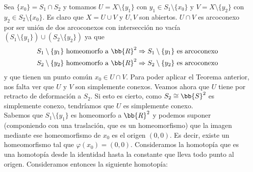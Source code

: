 \begin{ejemplo}
\begin{enumerate}
\begin{figure}[ht]
        \end{figure}
        
        Sea $\{x_0\} = S_1\cap S_2$ y tomamos $U=X\setminus\{y_1\}$ con $y_1\in S_1\setminus\{x_0\}$ y $V=X\setminus\{y_2\}$ con $y_2\in S_2\setminus\{x_0\}$. Es claro que $X=U \cup V$ y $U,V$ son abiertos. $U\cap V$ es arcoconexo por ser unión de dos arcoconexos con intersección no vacía $(S_1\setminus\{y_1\})\cup (S_2\setminus\{y_2\})$ ya que 
        \begin{gather*}
            S_1\setminus\{y_1\} \text{ homeomorfo a } \bb{R}^2 \Rightarrow S_1\setminus\{y_1\} \text{ es arcoconexo}\\
            S_2\setminus\{y_2\} \text{ homeomorfo a } \bb{R}^2 \Rightarrow S_2\setminus\{y_2\} \text{ es arcoconexo}
        \end{gather*}
        y que tienen un punto común $x_0\in U\cap V$. Para poder aplicar el Teorema anterior, nos falta ver que $U$ y $V$ son simplemente conexos. Veamos ahora que $U$ tiene por retracto de deformación a $S_2$. Si esto es cierto, como $S_2\cong \bb{S}^2$ es simplemente conexo, tendríamos que $U$ es simplemente conexo.\\
        
        Sabemos que $S_1\setminus\{y_1\}$ es homeomorfo a $\bb{R}^2$ y podemos suponer (componiendo con una traslación, que es un homeomorfismo) que la imagen mediante ese homeomorfismo de $x_0$ es el origen $(0,0)$. Es decir, existe un homeomorfismo
        tal que $\varphi(x_0)=(0,0)$. Consideramos la homotopía
        que es una homotopía desde la identidad hasta la constante que lleva todo punto al origen. Consideramos entonces la siguiente homotopía:
        

\end{enumerate}
\end{ejemplo}
